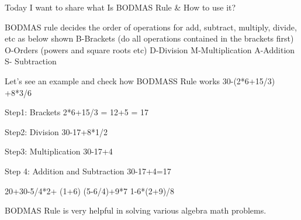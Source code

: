 \documentclass[12pt]{article}
\begin{document}
Today I want to share what Is BODMAS Rule & How to use it?

BODMAS rule decides the order of operations for add, subtract, multiply, divide, etc as below shown
B-Brackets (do all operations contained in the brackets first)
O-Orders (powers and square roots etc)
D-Division 
 M-Multiplication
A-Addition 
S- Subtraction

Let’s see an example and check how BODMASS Rule works
30-(2*6+15/3) +8*3/6

Step1: Brackets
2*6+15/3 = 12+5 = 17

Step2: Division
30-17+8*1/2

Step3: Multiplication
30-17+4

Step 4: Addition and Subtraction
30-17+4=17


20+30-5/4*2+ (1+6)
(5-6/4)+9*7
1-6*(2+9)/8


BODMAS Rule is very helpful in solving various algebra math problems.
\end{document}
